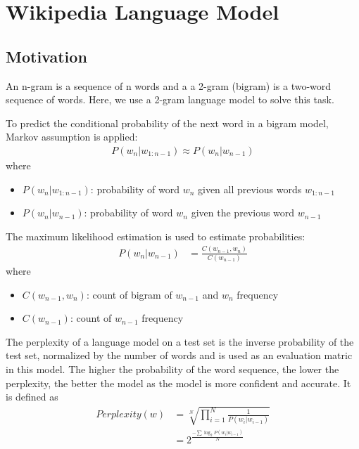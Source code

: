 \section{Wikipedia Language Model}

\subsection{Motivation \cite{n-gram:ch3}}
An n-gram is a sequence of n words and a a 2-gram (bigram) is a two-word sequence of words.
Here, we use a 2-gram language model to solve this task.

To predict the conditional probability of the next word in a bigram model, Markov assumption is applied:
\begin{align}
    P(w_n | w_{1:n-1}) \approx P(w_n | w_{n-1})
\end{align}
where
\begin{itemize}
    \item $P(w_n | w_{1:n-1})$: probability of word $w_n$ given all previous words $w_{1:n-1}$
    \item $P(w_n | w_{n-1})$: probability of word $w_n$ given the previous word $w_{n-1}$
\end{itemize}

The maximum likelihood estimation is used to estimate probabilities:
\begin{align}
    P(w_n | w_{n-1}) %
    &=\frac{C(w_{n-1}, w_n)}{C(w_{n-1})}
\end{align}
where
\begin{itemize}
    \item $C(w_{n-1}, w_n)$: count of bigram of $w_{n-1}$ and $w_n$ frequency
    \item $C(w_{n-1})$: count of $w_{n-1}$ frequency
\end{itemize}



The perplexity of a language model on a test set is the inverse probability of the test set, normalized by the number of words and is used as an evaluation matric in this model.
The higher the probability of the word sequence, the lower the perplexity, the better the model as the model is more confident and accurate.
It is defined as 
\begin{align}
    Perplexity(w) &= \sqrt[N]{\prod_{i=1}^{N} \frac{1}{P(w_i | w_{i-1})}} \label{eq:perplexity}\\
    &= 2^{\frac{-\sum \log_2 P(w_i | w_{i-1})}{N}}  \label{eq:perplexity-log}
\end{align}

